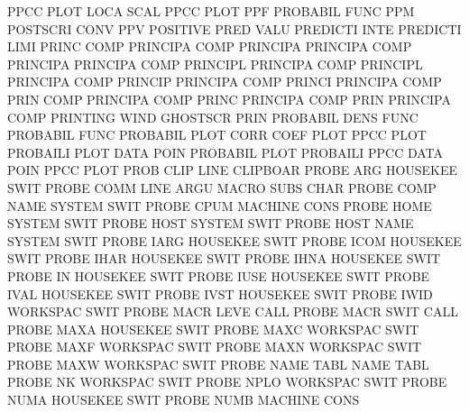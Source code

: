 PPCC     PLOT LOCA SCAL                 PPCC     PLOT
PPF                                     PROBABIL FUNC
PPM                                     POSTSCRI CONV
PPV                                     POSITIVE PRED VALU
PREDICTI INTE                           PREDICTI LIMI
PRINC    COMP                           PRINCIPA COMP
PRINCIPA                                PRINCIPA COMP
PRINCIPA                                PRINCIPA COMP
PRINCIPL                                PRINCIPA COMP
PRINCIPL                                PRINCIPA COMP
PRINCIP                                 PRINCIPA COMP
PRINCI                                  PRINCIPA COMP
PRIN     COMP                           PRINCIPA COMP
PRINC                                   PRINCIPA COMP
PRIN                                    PRINCIPA COMP
PRINTING WIND                           GHOSTSCR PRIN
PROBABIL DENS FUNC                      PROBABIL FUNC
PROBABIL PLOT CORR COEF PLOT            PPCC     PLOT
PROBAILI PLOT DATA POIN                 PROBABIL PLOT
PROBAILI PPCC DATA POIN                 PPCC     PLOT
PROB     CLIP LINE                      CLIPBOAR
PROBE    ARG                            HOUSEKEE SWIT
PROBE    COMM LINE ARGU                 MACRO    SUBS CHAR
PROBE    COMP NAME                      SYSTEM   SWIT
PROBE    CPUM                           MACHINE  CONS
PROBE    HOME                           SYSTEM   SWIT
PROBE    HOST                           SYSTEM   SWIT
PROBE    HOST NAME                      SYSTEM   SWIT
PROBE    IARG                           HOUSEKEE SWIT
PROBE    ICOM                           HOUSEKEE SWIT
PROBE    IHAR                           HOUSEKEE SWIT
PROBE    IHNA                           HOUSEKEE SWIT
PROBE    IN                             HOUSEKEE SWIT
PROBE    IUSE                           HOUSEKEE SWIT
PROBE    IVAL                           HOUSEKEE SWIT
PROBE    IVST                           HOUSEKEE SWIT
PROBE    IWID                           WORKSPAC SWIT
PROBE    MACR LEVE                      CALL
PROBE    MACR SWIT                      CALL
PROBE    MAXA                           HOUSEKEE SWIT
PROBE    MAXC                           WORKSPAC SWIT
PROBE    MAXF                           WORKSPAC SWIT
PROBE    MAXN                           WORKSPAC SWIT
PROBE    MAXW                           WORKSPAC SWIT
PROBE    NAME TABL                      NAME     TABL
PROBE    NK                             WORKSPAC SWIT
PROBE    NPLO                           WORKSPAC SWIT
PROBE    NUMA                           HOUSEKEE SWIT
PROBE    NUMB                           MACHINE  CONS
